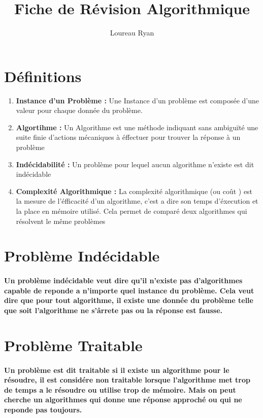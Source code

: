 \documentclass{article}
\title{Fiche de Révision Algorithmique}
\author{Loureau Ryan}
\begin{document}
\maketitle 
\tableofcontents

\section{\textcolor{redhighlight}{Définitions}}
\begin{enumerate}
\item \textbf{Instance d'un Problème :}
Une Instance d'un problème est composée d'une valeur pour chaque donnée du problème.
\item \textbf{Algortihme :}
Un Algorithme est une méthode indiquant sans ambiguïté une suite finie d'actions mécaniques à éffectuer pour trouver la réponse à un problème
\item \textbf{Indécidabilité :}
Un problème pour lequel aucun algorithme n'existe est dit indécidable
\item \textbf{Complexité Algorithmique :}
La complexité algorithmique (ou coût ) est la mesure de l'éfficacité d'un algorithme, c'est a dire son temps d'éxecution et la place en mémoire utilisé. Cela permet de comparé deux algorithmes qui résolvent le même problèmes

\end{enumerate}

\section{\textcolor{redhighlight}{Problème Indécidable}}
\paragraph{Un problème indécidable veut dire qu'il n'existe pas d'algorithmes capable de reponde a n'importe quel instance du problème. Cela veut dire que pour tout algorithme, il existe une donnée du problème telle que soit l'algorithme ne s'ârrete pas ou la réponse est fausse.}

\section{\textcolor{redhighlight}{Problème Traitable}}
\paragraph{Un problème est dit traitable si il existe un algorithme pour le résoudre, il est considére non traitable lorsque l'algorithme met trop de temps a le résoudre ou utilise trop de mémoire. Mais on peut cherche un algorithmes qui donne une réponse approché ou qui ne reponde pas toujours.}
\end{document}

